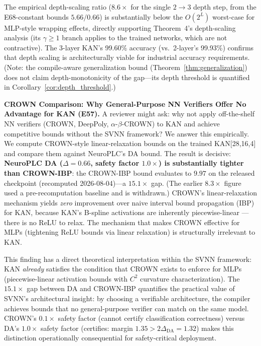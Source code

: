 \documentclass[journal,onecolumn]{IEEEtran}
\begin{document}
The empirical depth-scaling ratio ($8.6\times$ for the single $2\to 3$
depth step, from the E68-constant bounds $5.66/0.66$) is substantially
below the $O(2^L)$
worst-case for MLP-style wrapping effects, directly supporting
Theorem~4's depth-scaling analysis (its $\gamma \geq 1$ branch applies
to the trained networks, which are not contractive). The 3-layer
KAN's 99.60\% accuracy (vs.\ 2-layer's 99.93\%) confirms that depth
scaling is architecturally viable for industrial accuracy requirements.
(Note: the compile-aware generalization bound
(Theorem~\ref{thm:generalization}) does not claim depth-monotonicity of
the gap---its depth threshold is quantified in
Corollary~\ref{cor:depth_threshold}.)

\vspace{4pt}
\noindent\textbf{CROWN Comparison: Why General-Purpose NN Verifiers Offer No
Advantage for KAN (E57).}
A reviewer might ask: why not apply off-the-shelf NN verifiers (CROWN,
DeepPoly, $\alpha$-$\beta$-CROWN) to KAN and achieve competitive bounds
without the SVNN framework? We answer this empirically.
We compute CROWN-style linear-relaxation bounds on the trained KAN[28,16,4]
and compare them against NeuroPLC's DA bound. The result is decisive:
\textbf{NeuroPLC DA ($\Delta = 0.66$, safety factor $1.0\times$) is
substantially tighter than CROWN-IBP}: the CROWN-IBP bound evaluates to
$9.97$ on the released checkpoint (recomputed 2026-08-04)---a $15.1\times$
gap. (The earlier $8.3\times$ figure used a pre-recomputation baseline
and is withdrawn.)
CROWN's linear-relaxation mechanism yields \textit{zero} improvement over
naive interval bound propagation (IBP) for KAN, because KAN's B-spline
activations are inherently piecewise-linear — there is no ReLU to relax.
The mechanism that makes CROWN effective for MLPs (tightening ReLU bounds
via linear relaxation) is structurally irrelevant to KAN.

This finding has a direct theoretical interpretation within the SVNN
framework: KAN \textit{already} satisfies the condition that CROWN exists
to enforce for MLPs (piecewise-linear activation bounds with $C^2$ curvature
characterization). The $15.1\times$ gap between DA and CROWN-IBP quantifies the
practical value of SVNN's architectural insight: by choosing a verifiable
architecture, the compiler achieves bounds that no general-purpose
verifier can match on the same model. CROWN's $0.1\times$ safety factor
(cannot certify classification correctness) versus DA's $1.0\times$ safety
factor (certifies: margin $1.35 > 2\Delta_{\text{DA}} = 1.32$) makes this distinction operationally
consequential for safety-critical deployment.
\end{document}
